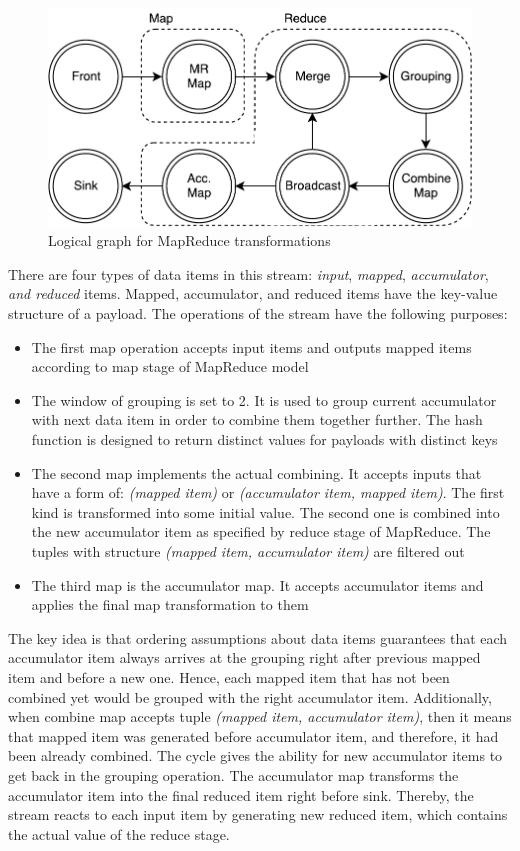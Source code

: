 \begin{figure}[htb]
  \centering
  \includegraphics[scale=0.5]{pics/mapreduce}
  \caption{Logical graph for MapReduce transformations}
  \label {mapreduce-graph-figure}
\end{figure}

There are four types of data items in this stream: {\it input}, {\it mapped}, {\it accumulator}, {\it and reduced} items. Mapped, accumulator, and reduced items have the key-value structure of a payload. The operations of the stream have the following purposes:

\begin{itemize}
  \item The first map operation accepts input items and outputs mapped items according to map stage of MapReduce model
  \item The window of grouping is set to 2. It is used to group current accumulator with next data item in order to combine them together further. The hash function is designed to return distinct values for payloads with distinct keys
  \item The second map implements the actual combining. It accepts inputs that have a form of: \textit{(mapped item)} or \textit{(accumulator item, mapped item)}. The first kind is transformed into some initial value. The second one is combined into the new accumulator item as specified by reduce stage of MapReduce. The tuples with structure \textit{(mapped item, accumulator item)} are filtered out
  \item The third map is the accumulator map. It accepts accumulator items and applies the final map transformation to them
\end{itemize}

The key idea is that ordering assumptions about data items guarantees that each accumulator item always arrives at the grouping right after previous mapped item and before a new one. Hence, each mapped item that has not been combined yet would be grouped with the right accumulator item. Additionally, when combine map accepts tuple {\it (mapped item, accumulator item)}, then it means that mapped item was generated before accumulator item, and therefore, it had been already combined. The cycle gives the ability for new accumulator items to get back in the grouping operation. The accumulator map transforms the accumulator item into the final reduced item right before sink. Thereby, the stream reacts to each input item by generating new reduced item, which contains the actual value of the reduce stage.

